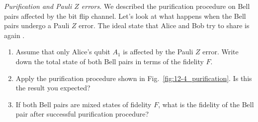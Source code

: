\begin{exercise}
\emph{Purification and Pauli $Z$ errors.} We described the purification procedure on Bell pairs affected by the bit flip channel. Let's look at what happens when the Bell pairs undergo a Pauli $Z$ error. The ideal state that Alice and Bob try to share is again \ket{\Phi^+}.
\begin{enumerate}[label=(\alph*)]
    \item Assume that only Alice's qubit $A_1$ is affected by the Pauli $Z$ error. Write down the total state of both Bell pairs in terms of the fidelity $F$.
    \item Apply the purification procedure shown in Fig.~\ref{fig:12-4_purification}. Is this the result you expected?
    \item If both Bell pairs are mixed states of fidelity $F$, what is the fidelity of the Bell pair after successful purification procedure?
\end{enumerate} 
\end{exercise}
